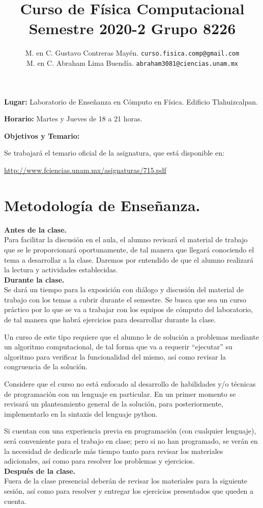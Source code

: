 \documentclass[12pt]{article}
\author{M. en C. Gustavo Contreras Mayén. \texttt{curso.fisica.comp@gmail.com}\\
M. en C. Abraham Lima Buendía. \texttt{abraham3081@ciencias.unam.mx}}
\title{Curso de Física Computacional\\{\large Semestre 2020-2 Grupo 8226}}
\date{ }
\begin{document}
\renewcommand\labelenumii{\theenumi.{\arabic{enumii}}}
\maketitle
\fontsize{12}{12}\selectfont
\textbf{Lugar: } Laboratorio de Enseñanza en Cómputo en Física. Edificio Tlahuizcalpan.
\par
\textbf{Horario: } Martes y Jueves de 18 a 21 horas.
\par
\par
\textbf{Objetivos y Temario:}
\par
Se trabajará el temario oficial de la asignatura, que está disponible en:

\href{http://www.fciencias.unam.mx/asignaturas/715.pdf}{http://www.fciencias.unam.mx/asignaturas/715.pdf}
\section{Metodología de Enseñanza.}
\textbf{Antes de la clase.}
\\
Para facilitar la discusión en el aula, el alumno revisará el material de trabajo que se le proporcionará oportunamente, de tal manera que llegará conociendo el tema a desarrollar a la clase. Daremos por entendido de que el alumno realizará la lectura y actividades establecidas.
\\
\textbf{Durante la clase.}
\\
Se dará un tiempo para la exposición con diálogo y discusión del material de trabajo con los temas a cubrir durante el semestre. Se busca que sea un curso práctico por lo que se va a trabajar con los equipos de cómputo del laboratorio, de tal manera que habrá ejercicios para desarrollar durante la clase.
\par
Un curso de este tipo requiere que el alumno le de solución a problemas mediante un algoritmo computacional, de tal forma que va a requerir \enquote{ejecutar} su algoritmo para verificar la funcionalidad del mismo, así como revisar la congruencia de la solución.
\par
Considere que el curso no está enfocado al desarrollo de habilidades y/o técnicas de programación con un lenguaje en particular. En un primer momento se revisará un planteamiento general de la solución, para posteriormente, implementarlo en la sintaxis del lenguaje python.
\par
Si cuentan con una experiencia previa en programación (con cualquier lenguaje), será conveniente para el trabajo en clase; pero si no han programado, se verán en la necesidad de dedicarle más tiempo tanto para revisar los materiales adicionales, así como para resolver los problemas y ejercicios.
\\
\textbf{Después de la clase.}
\\
Fuera de la clase presencial deberán de revisar los materiales para la siguiente sesión, así como para resolver y entregar los ejercicios presentados que queden a cuenta.
\end{document}
